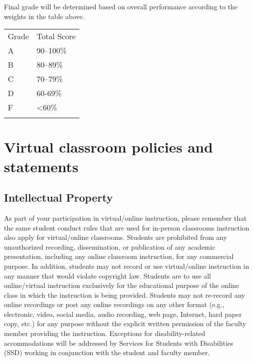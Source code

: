 \newpage

Final grade will be determined based on overall performance according to
the weights in the table above.

\begin{longtable}[]{@{}ll@{}}
\toprule
Grade & Total Score \\ \addlinespace
\midrule
\endhead
A & 90--100\% \\ \addlinespace
B & 80--89\% \\ \addlinespace
C & 70--79\% \\ \addlinespace
D & 60-69\% \\ \addlinespace
F & \textless60\% \\ \addlinespace
\bottomrule
\end{longtable}

\hypertarget{virtual-classroom-policies-and-statements}{%
\section{Virtual classroom policies and
statements}\label{virtual-classroom-policies-and-statements}}

\hypertarget{intellectual-property}{%
\subsection{Intellectual Property}\label{intellectual-property}}

As part of your participation in virtual/online instruction, please
remember that the same student conduct rules that are used for in-person
classrooms instruction also apply for virtual/online classrooms.
Students are prohibited from any unauthorized recording, dissemination,
or publication of any academic presentation, including any online
classroom instruction, for any commercial purpose. In addition, students
may not record or use virtual/online instruction in any manner that
would violate copyright law. Students are to use all online/virtual
instruction exclusively for the educational purpose of the online class
in which the instruction is being provided. Students may not re-record
any online recordings or post any online recordings on any other format
(e.g., electronic, video, social media, audio recording, web page,
Internet, hard paper copy, etc.) for any purpose without the explicit
written permission of the faculty member providing the instruction.
Exceptions for disability-related accommodations will be addressed by
Services for Students with Disabilities (SSD) working in conjunction
with the student and faculty member.


